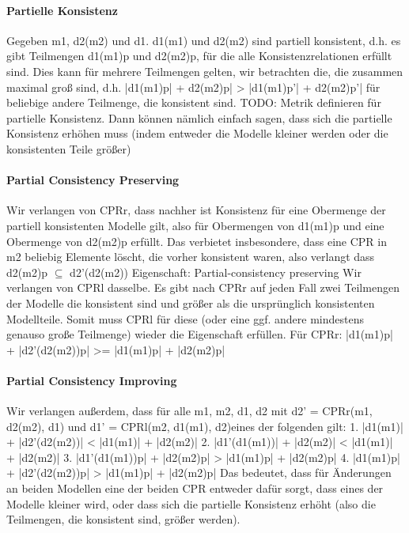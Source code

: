 \paragraph{Partielle Konsistenz}
Gegeben m1, d2(m2) und d1.
d1(m1) und d2(m2) sind partiell konsistent, d.h. es gibt Teilmengen d1(m1)p und d2(m2)p, für die alle Konsistenzrelationen erfüllt sind.
Dies kann für mehrere Teilmengen gelten, wir betrachten die, die zusammen maximal groß sind, d.h. |d1(m1)p| + d2(m2)p| > |d1(m1)p'| + d2(m2)p'| für beliebige andere Teilmenge, die konsistent sind.
TODO: Metrik definieren für partielle Konsistenz. Dann können nämlich einfach sagen, dass sich die partielle Konsistenz erhöhen muss (indem entweder die Modelle kleiner werden oder die konsistenten Teile größer)


\paragraph{Partial Consistency Preserving}
Wir verlangen von CPRr, dass nachher ist Konsistenz für eine Obermenge der partiell konsistenten Modelle gilt, also für Obermengen von d1(m1)p und eine Obermenge von d2(m2)p erfüllt. Das verbietet insbesondere, dass eine CPR in m2 beliebig Elemente löscht, die vorher konsistent waren, also verlangt dass d2(m2)p $\subseteq$ d2'(d2(m2))
Eigenschaft: Partial-consistency preserving
Wir verlangen von CPRl dasselbe.
Es gibt nach CPRr auf jeden Fall zwei Teilmengen der Modelle die konsistent sind und größer als die ursprünglich konsistenten Modellteile.
Somit muss CPRl für diese (oder eine ggf. andere mindestens genauso große Teilmenge) wieder die Eigenschaft erfüllen.
Für CPRr:
|d1(m1)p| + |d2'(d2(m2))p| >= |d1(m1)p| + |d2(m2)p|

\paragraph{Partial Consistency Improving}
Wir verlangen außerdem, dass für alle m1, m2, d1, d2 mit d2' = CPRr(m1, d2(m2), d1) und d1' = CPRl(m2, d1(m1), d2)eines der folgenden gilt:
1. |d1(m1)| + |d2'(d2(m2))| < |d1(m1)| + |d2(m2)|
2. |d1'(d1(m1))| + |d2(m2)| < |d1(m1)| + |d2(m2)|
3. |d1'(d1(m1))p| + |d2(m2)p| > |d1(m1)p| + |d2(m2)p|
4. |d1(m1)p| + |d2'(d2(m2))p| > |d1(m1)p| + |d2(m2)p|
Das bedeutet, dass für Änderungen an beiden Modellen eine der beiden CPR entweder dafür sorgt, dass eines der Modelle kleiner wird, oder dass sich die partielle Konsistenz erhöht (also die Teilmengen, die konsistent sind, größer werden).

